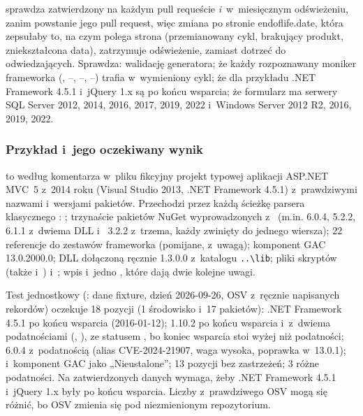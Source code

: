  sprawdza zatwierdzony  na każdym pull requeście
\emph{i}~w~miesięcznym odświeżeniu, zanim powstanie jego pull request, więc zmiana po stronie
endoflife.date, która zepsułaby to, na czym polega strona (przemianowany cykl, brakujący
produkt, zniekształcona data), zatrzymuje odświeżenie, zamiast dotrzeć do odwiedzających.
Sprawdza: walidację generatora; że każdy rozpoznawany moniker frameworka (,
--, --,
--) trafia w~wymieniony cykl; że dla przykładu .NET
Framework 4.5.1 i~jQuery 1.x są po końcu wsparcia; że formularz ma serwery SQL Server 2012,
2014, 2016, 2017, 2019, 2022 i~Windows Server 2012 R2, 2016, 2019, 2022.

\subsubsection{Przykład i~jego oczekiwany wynik}

 to według komentarza w~pliku fikcyjny projekt typowej
aplikacji ASP.NET MVC~5 z~2014 roku (Visual Studio 2013, .NET Framework 4.5.1)
z~prawdziwymi nazwami i~wersjami pakietów. Przechodzi przez każdą ścieżkę parsera
klasycznego :  ;
trzynaście pakietów NuGet wyprowadzonych z~ (m.in.
 6.0.4,  5.2.2,
 6.1.1 z~dwiema DLL i~ 3.2.2
z~trzema, każdy zwinięty do jednego wiersza); 22 referencje do zestawów frameworka
(pomijane, z~uwagą); komponent GAC 
13.0.2000.0; DLL dołączoną ręcznie  1.3.0.0 z~katalogu
\texttt{..\textbackslash lib}; pliki skryptów  (także
 i~) i~; wpis
 i~jedno , które dają dwie kolejne
uwagi.

Test jednostkowy (: dane fixture, dzień 2026-09-26, OSV z~ręcznie napisanych
rekordów) oczekuje 18 pozycji (1 środowisko i~17 pakietów): .NET Framework 4.5.1 po końcu
wsparcia (2016-01-12);  1.10.2 po końcu wsparcia i~z~dwiema podatnościami
(, ), ze statusem
, bo koniec wsparcia stoi wyżej niż podatności;  6.0.4
z~podatnością  (alias CVE-2024-21907, waga wysoka, poprawka
w~13.0.1);  i~komponent GAC jako „Nieustalone”; 13 pozycji bez
zastrzeżeń; 3 różne podatności. Na zatwierdzonych danych  wymaga,
żeby .NET Framework 4.5.1 i~jQuery 1.x były po końcu wsparcia. Liczby z~prawdziwego OSV
mogą się różnić, bo OSV zmienia się pod niezmienionym repozytorium.

